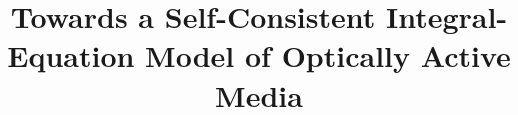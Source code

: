 \documentclass[conference]{IEEEtran}
\begin{document}
\title{Towards a Self-Consistent Integral-Equation Model of Optically Active Media}



\maketitle
\end{document}
